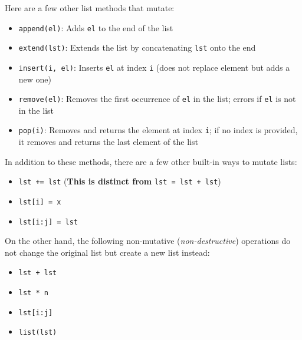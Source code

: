 Here are a few other list methods that mutate:
\begin{itemize}
\item \lstinline{append(el)}: Adds \lstinline{el} to the end of the list
\item \lstinline{extend(lst)}: Extends the list by concatenating \lstinline{lst} onto the end
\item \lstinline{insert(i, el)}: Inserts \lstinline{el} at index \lstinline{i} (does not replace element but adds a new one)
\item \lstinline{remove(el)}: Removes the first occurrence of \lstinline{el} in the list; errors if \lstinline{el} is not in the list 
\item \lstinline{pop(i)}: Removes and returns the element at index \lstinline{i}; if no index is provided, it removes and returns the last element of the list
\end{itemize}

In addition to these methods, there are a few other built-in ways to mutate lists: 

\begin{itemize}
\item \lstinline$lst += lst$ (\textbf{This is distinct from} \lstinline$lst = lst + lst$)
\item \lstinline$lst[i] = x$
\item \lstinline$lst[i:j] = lst$
\end{itemize}

\vspace{\parskip}

On the other hand, the following non-mutative (\emph{non-destructive}) operations do not change the original list but create a new list instead:

\begin{itemize}
\item \lstinline$lst + lst$
\item \lstinline$lst * n$
\item \lstinline$lst[i:j]$
\item \lstinline$list(lst)$
\end{itemize}

